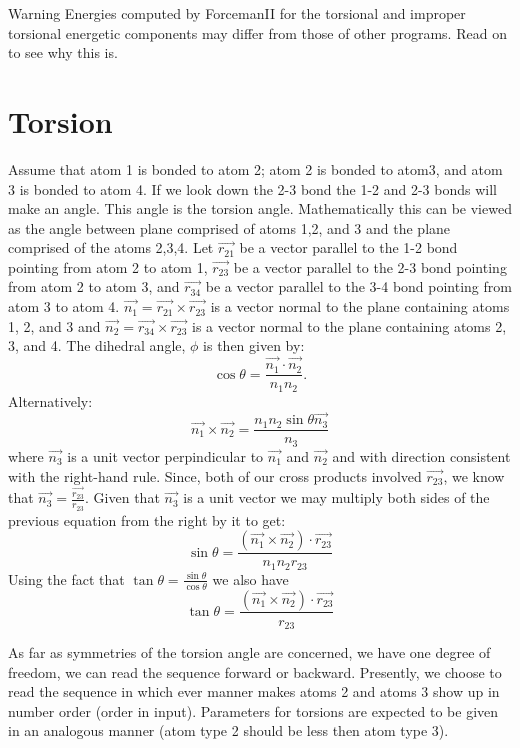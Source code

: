\begin{DoxyWarning}{Warning}
Energies computed by Forceman\+II for the torsional and improper torsional energetic components may differ from those of other programs. Read on to see why this is.
\end{DoxyWarning}
\section*{Torsion}

Assume that atom 1 is bonded to atom 2; atom 2 is bonded to atom3, and atom 3 is bonded to atom 4. If we look down the 2-\/3 bond the 1-\/2 and 2-\/3 bonds will make an angle. This angle is the torsion angle. Mathematically this can be viewed as the angle between plane comprised of atoms 1,2, and 3 and the plane comprised of the atoms 2,3,4. Let $\vec{r_{21}}$ be a vector parallel to the 1-\/2 bond pointing from atom 2 to atom 1, $\vec{r_{23}}$ be a vector parallel to the 2-\/3 bond pointing from atom 2 to atom 3, and $\vec{r_{34}}$ be a vector parallel to the 3-\/4 bond pointing from atom 3 to atom 4. $\vec{n_1}=\vec{r_{21}}\times\vec{r_{23}}$ is a vector normal to the plane containing atoms 1, 2, and 3 and $\vec{n_2}=\vec{r_{34}}\times\vec{r_{23}}$ is a vector normal to the plane containing atoms 2, 3, and 4. The dihedral angle, $\phi$ is then given by\+: \[ \cos\theta=\frac{\vec{n_1}\cdot\vec{n_2}}{n_1 n_2}. \] Alternatively\+: \[ \vec{n_1}\times\vec{n_2}=\frac{n_1 n_2\sin\theta \vec{n_3}}{n_3} \] where $\vec{n_3}$ is a unit vector perpindicular to $\vec{n_1}$ and $\vec{n_2}$ and with direction consistent with the right-\/hand rule. Since, both of our cross products involved $\vec{r_{23}}$, we know that $\vec{n_3}=\frac{\vec{r_{23}}}{r_{23}}$. Given that $\vec{n_3}$ is a unit vector we may multiply both sides of the previous equation from the right by it to get\+: \[ \sin\theta=\frac{\left(\vec{n_1}\times\vec{n_2}\right)\cdot\vec{r_{23}}} {n_1 n_2 r_{23}} \] Using the fact that $\tan\theta=\frac{\sin\theta}{\cos\theta}$ we also have \[ \tan\theta=\frac{\left(\vec{n_1}\times\vec{n_2}\right)\cdot\vec{r_{23}}} {r_{23}} \]

As far as symmetries of the torsion angle are concerned, we have one degree of freedom, we can read the sequence forward or backward. Presently, we choose to read the sequence in which ever manner makes atoms 2 and atoms 3 show up in number order (order in input). Parameters for torsions are expected to be given in an analogous manner (atom type 2 should be less then atom type 3).

